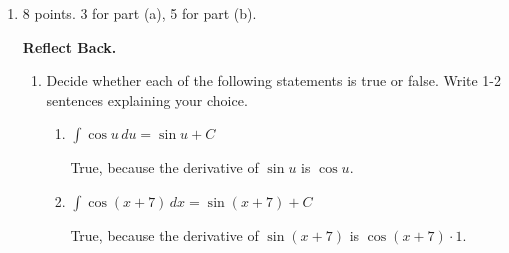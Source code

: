 \documentclass{article}
\begin{document}
\begin{enumerate}
\begin{enumerate}
    \begin{solution}
      The house's price at $t = 2$ is
      \begin{align*}
        300,000 + \int_0^2 r(t)\,dt &= 300,000 + 15,000 \int_0^2
        1.05^t\,dt \\
        &= 300,000 + 15,000 \left( \left. \frac{1.05^t}{\ln 1.05}
          \right|_0^2 \right) \\
        &= \boxed{300,000 + 15,000 \left( \frac{1.05^2 - 1 }{\ln 1.05}
          \right)} \\
        & \boxed{\approx 331512.50}
      \end{align*}
    \end{solution}

  \end{enumerate}  
\fi

\pspace{\newpage}

\item 

\begin{grading}
8 points. 3 for part (a), 5 for part (b).
\end{grading}

 \textbf{Reflect Back.}

  \begin{enumerate}
  \item Decide whether each of the following statements is true or false. Write 1-2 sentences explaining your choice.

  \probonly{\raggedcolumns}
    \begin{enumerate}
    \item
      \begin{problem}
        $\displaystyle \int \cos u\,du = \sin u + C$
      \end{problem}

      \begin{solution} %
        True, because the derivative of $\sin u$ is $\cos u$.
      \end{solution}

    \item
      \begin{problem}
        $\displaystyle \int \cos(x + 7)\,dx = \sin(x + 7) + C$
      \end{problem}

      \begin{solution} %
        True, because the derivative of $\sin(x + 7)$ is $\cos(x + 7)
        \cdot 1$. 
      \end{solution}


\end{enumerate}
\end{enumerate}
\end{enumerate}
\end{document}
